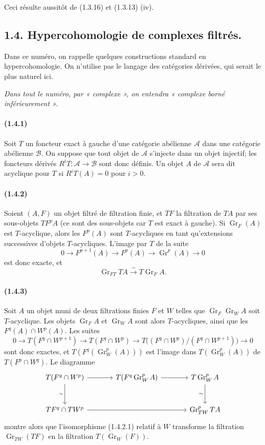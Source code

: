 \documentclass[10pt]{article}
\newcommand{\Gr}{\operatorname{Gr}}
\newcommand{\calA}{\mathcal A}
\newcommand{\calB}{\mathcal B}
\newcommand{\iso}{\xrightarrow{\sim}}
\begin{document}
Ceci résulte aussitôt de (1.3.16) et (1.3.13) (iv).

\subsection*{1.4. Hypercohomologie de complexes filtrés.}

Dans ce numéro, on rappelle quelques constructions standard en hypercohomologie. On n'utilise pas le langage des catégories dérivées, qui serait le plus naturel ici.

\emph{Dans tout le numéro, par « complexe », on entendra « complexe borné inférieurement ».}

\paragraph{(1.4.1)} Soit $T$ un foncteur exact à gauche d'une catégorie abélienne $\calA$ dans une catégorie abélienne $\calB$. On suppose que tout objet de $\calA$ s'injecte dans un objet injectif; les foncteurs dérivés $R^iT:\calA\to\calB$ sont donc définis. Un objet $A$ de $\calA$ sera dit acyclique pour $T$ si $R^iT(A)=0$ pour $i>0$.

\paragraph{(1.4.2)} Soient $(A,F)$ un objet filtré de filtration finie, et $TF$ la filtration de $TA$ par ses sous-objets $TF^pA$ (ce sont des sous-objets car $T$ est exact à gauche). Si $\Gr_F(A)$ est $T$-acyclique, alors les $F^p(A)$ sont $T$-acycliques en tant qu'extensions successives d'objets $T$-acycliques. L'image par $T$ de la suite
\[
0\to F^{p+1}(A)\to F^p(A)\to\Gr^p(A)\to0
\]
est donc exacte, et
\[
\tag{1.4.2.1}
\Gr_{FT}TA\iso T\Gr_FA.
\]

\paragraph{(1.4.3)} Soit $A$ un objet muni de deux filtrations finies $F$ et $W$ telles que $\Gr_F\Gr_WA$ soit $T$-acyclique. Les objets $\Gr_FA$ et $\Gr_WA$ sont alors $T$-acycliques, ainsi que les $F^q(A)\cap W^p(A)$. Les suites
\[
0\to T(F^q\cap W^{p+1})\to T(F^q\cap W^p)\to T\bigl((F^q\cap W^p)/(F^q\cap W^{p+1})\bigr)\to0
\]
sont donc exactes, et $T(F^q(\Gr_W^p(A)))$ est l'image dans $T(\Gr_W^p(A))$ de $T(F^p\cap W^q)$. Le diagramme
\[
\begin{tikzcd}[column sep=large,row sep=large]
T(F^q\cap W^p) \arrow[r] \arrow[d,"\sim"'] & T(F^q\Gr_W^pA) \arrow[r] & T\Gr_W^pA \arrow[d,"\sim"']\\
TF^q\cap TW^p \arrow[rr] && \Gr_{TW}^pTA
\end{tikzcd}
\]
montre alors que l'isomorphisme (1.4.2.1) relatif à $W$ transforme la filtration $\Gr_{TW}(TF)$ en la filtration $T(\Gr_W(F))$.
\end{document}
